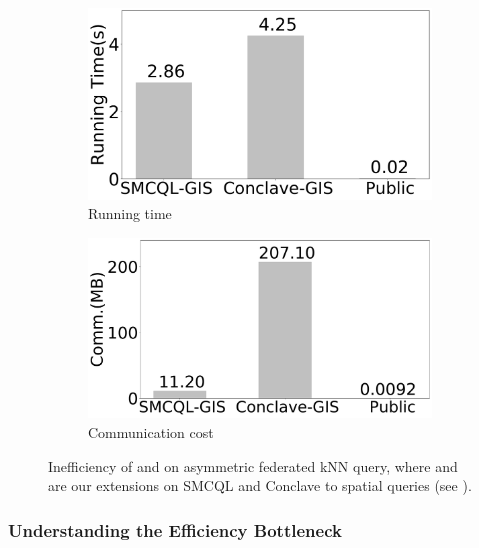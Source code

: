 \begin{figure}[t]
    \centering
    \begin{subfigure}{0.228\textwidth}
        \centering
        \includegraphics[width=\linewidth]{intro_time.pdf}
        \caption{Running time}
		\label{fig:cmp-runtime-k}
   \end{subfigure}
   \begin{subfigure}{0.242\textwidth}
        \centering
        \includegraphics[width=\linewidth]{intro_cost.pdf}
        \caption{Communication cost}
		\label{fig:cmp-network-k}
    \end{subfigure}
    \caption{Inefficiency of \conclave and \smcql on asymmetric federated kNN query,
    where \smcql and \conclave are our extensions on SMCQL \cite{vldb17smcql} and Conclave \cite{eurosys19conclave} to spatial queries (see ).}
    \label{fig:cmp-k}
\end{figure}

\subsubsection{Understanding the Efficiency Bottleneck}
\label{subsubsec:understanding}

